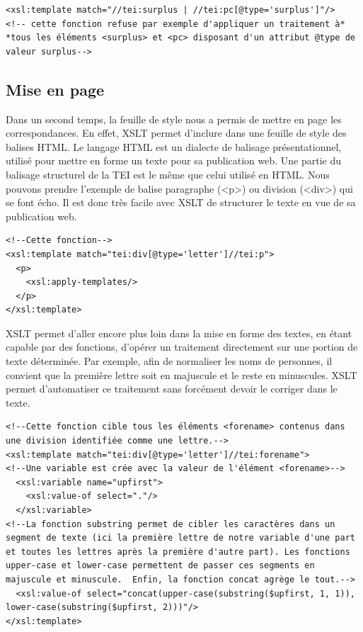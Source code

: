 \documentclass[12pt,a4paper]{book} %
\begin{document}
\begin{lstlisting}
<xsl:template match="//tei:surplus | //tei:pc[@type='surplus']"/>
<!-- cette fonction refuse par exemple d'appliquer un traitement à* *tous les éléments <surplus> et <pc> disposant d'un attribut @type de valeur surplus-->
\end{lstlisting}
\bigskip

\subsection{Mise en page}

Dans un second temps, la feuille de style nous a permis de mettre en page les correspondances. En effet, XSLT permet d'inclure dans une feuille de style des balises HTML. Le langage HTML est un dialecte de balisage présentationnel, utilisé pour mettre en forme un texte pour sa publication web. Une partie du balisage structurel de la TEI est le même que celui utilisé en HTML. Nous pouvons prendre l'exemple de balise paragraphe (<p>) ou division (<div>) qui se font écho. Il est donc très facile avec XSLT de structurer le texte en vue de sa publication web.
\bigskip

\begin{lstlisting}
<!--Cette fonction-->
<xsl:template match="tei:div[@type='letter']//tei:p">
  <p>
    <xsl:apply-templates/>            
  </p>                    
</xsl:template>   
\end{lstlisting}
\bigskip

XSLT permet d'aller encore plus loin dans la mise en forme des textes, en étant capable par des fonctions, d'opérer un traitement directement sur une portion de texte déterminée. Par exemple, afin de normaliser les noms de personnes, il convient que la première lettre soit en majuscule et le reste en minuscules. XSLT permet d'automatiser ce traitement sans forcément devoir le corriger dans le texte.
\bigskip

\begin{lstlisting}
<!--Cette fonction cible tous les éléments <forename> contenus dans une division identifiée comme une lettre.-->
<xsl:template match="tei:div[@type='letter']//tei:forename">
<!--Une variable est crée avec la valeur de l'élément <forename>-->
  <xsl:variable name="upfirst">
    <xsl:value-of select="."/>
  </xsl:variable>
<!--La fonction substring permet de cibler les caractères dans un segment de texte (ici la première lettre de notre variable d'une part et toutes les lettres après la première d'autre part). Les fonctions upper-case et lower-case permettent de passer ces segments en majuscule et minuscule.  Enfin, la fonction concat agrège le tout.-->
  <xsl:value-of select="concat(upper-case(substring($upfirst, 1, 1)), lower-case(substring($upfirst, 2)))"/>
</xsl:template>
\end{lstlisting}
\bigskip
\end{document}
